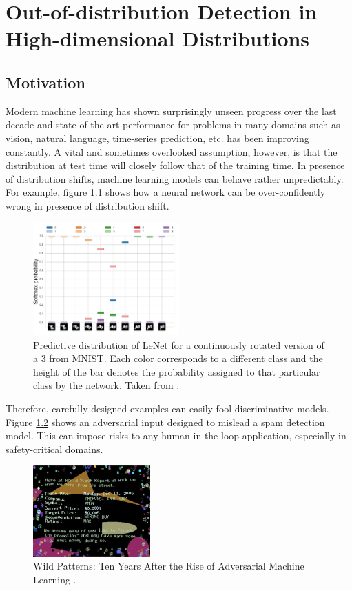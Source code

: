 \chapter{Out-of-distribution Detection in High-dimensional Distributions} \label{ch-1}

\section{Motivation}

Modern machine learning has shown surprisingly unseen progress over the last decade and state-of-the-art performance for problems in many domains such as vision, natural language, time-series prediction, etc. has been improving constantly. A vital and sometimes overlooked assumption, however, is that the distribution at test time will closely follow that of the training time. In presence of distribution shifts, machine learning models can behave rather unpredictably. For example, figure \ref{fig:4-1} shows how a neural network can be over-confidently wrong in presence of distribution shift.

\begin{figure}[h]
    \centering
    \includegraphics[width=0.5\textwidth]{figures/ch4/rotate3.png}
    \caption{Predictive distribution of LeNet for a continuously rotated version of a 3 from MNIST. Each color corresponds to a different class and the height of the bar denotes the probability assigned to that particular class by the network. Taken from \cite{louizos2017multiplicative}.}
    \label{fig:4-1}
\end{figure}

Therefore, carefully designed examples can easily fool discriminative models. Figure \ref{fig:4-2} shows an adversarial input designed to mislead a spam detection model. This can impose risks to any human in the loop application, especially in safety-critical domains. 

\begin{figure}[h]
    \centering
    \includegraphics[width=0.4\textwidth]{figures/ch4/spam.png}
    \caption{Wild Patterns: Ten Years After the Rise of Adversarial Machine Learning \cite{biggio2018wild}.}
    \label{fig:4-2}
\end{figure}


